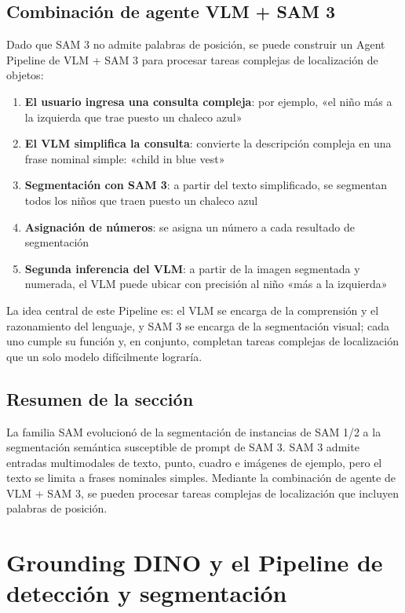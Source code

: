 \documentclass[a4paper]{article}
\begin{document}
\subsection{Combinación de agente VLM + SAM 3}

Dado que SAM 3 no admite palabras de posición, se puede construir un Agent Pipeline de VLM + SAM 3 para procesar tareas complejas de localización de objetos:

\begin{enumerate}
    \item \textbf{El usuario ingresa una consulta compleja}: por ejemplo, «el niño más a la izquierda que trae puesto un chaleco azul»
    \item \textbf{El VLM simplifica la consulta}: convierte la descripción compleja en una frase nominal simple: «child in blue vest»
    \item \textbf{Segmentación con SAM 3}: a partir del texto simplificado, se segmentan todos los niños que traen puesto un chaleco azul
    \item \textbf{Asignación de números}: se asigna un número a cada resultado de segmentación
    \item \textbf{Segunda inferencia del VLM}: a partir de la imagen segmentada y numerada, el VLM puede ubicar con precisión al niño «más a la izquierda»
\end{enumerate}

La idea central de este Pipeline es: el VLM se encarga de la comprensión y el razonamiento del lenguaje, y SAM 3 se encarga de la segmentación visual; cada uno cumple su función y, en conjunto, completan tareas complejas de localización que un solo modelo difícilmente lograría.

\subsection{Resumen de la sección}

La familia SAM evolucionó de la segmentación de instancias de SAM 1/2 a la segmentación semántica susceptible de prompt de SAM 3. SAM 3 admite entradas multimodales de texto, punto, cuadro e imágenes de ejemplo, pero el texto se limita a frases nominales simples. Mediante la combinación de agente de VLM + SAM 3, se pueden procesar tareas complejas de localización que incluyen palabras de posición.
\section{Grounding DINO y el Pipeline de detección y segmentación}
\end{document}
